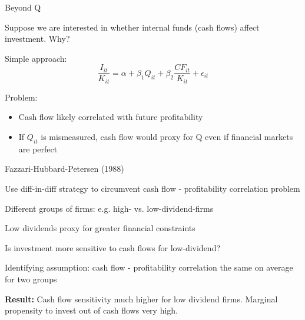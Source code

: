 \documentclass[11pt, aspectratio=169]{beamer}
\newenvironment{witemize}{\itemize\addtolength{\itemsep}{10pt}}{\enditemize}
\begin{document}
\begin{frame}{Beyond Q}
\begin{witemize}
\item Suppose we are interested in whether internal funds (cash flows) affect investment. Why? 

\item Simple approach:
\begin{equation*}
	\frac{I_{it}}{K_{it}} = \alpha + \beta_1 Q_{it} + \beta_2 \frac{CF_{it}}{K_{it}} + \epsilon_{it}
\end{equation*}

\item Problem:
\begin{itemize}
	\item Cash flow likely correlated with future profitability
	\item If $Q_{it}$ is mismeasured, cash flow would proxy for Q even if financial markets are perfect
\end{itemize}

\end{witemize}
\end{frame}


\begin{frame}{Fazzari-Hubbard-Petersen (1988)}
\begin{witemize}
\item Use diff-in-diff strategy to circumvent cash flow - profitability correlation problem

\item Different groups of firms: e.g. high- vs. low-dividend-firms

\item Low dividends proxy for greater financial constraints

\item Is investment more sensitive to cash flows for low-dividend?

\item Identifying assumption: cash flow - profitability correlation the same on average for two groups

\item \textbf{Result:} Cash flow sensitivity much higher for low dividend firms. Marginal propensity to invest out of cash flows very high. 

\end{witemize}
\end{frame}
\end{document}
